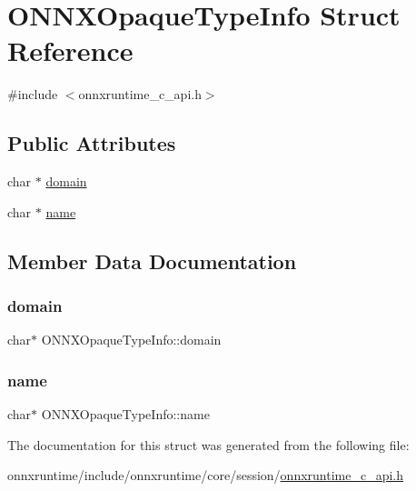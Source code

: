 \hypertarget{structONNXOpaqueTypeInfo}{}\section{O\+N\+N\+X\+Opaque\+Type\+Info Struct Reference}
\label{structONNXOpaqueTypeInfo}


{\ttfamily \#include $<$onnxruntime\+\_\+c\+\_\+api.\+h$>$}

\subsection*{Public Attributes}
\begin{DoxyCompactItemize}
\item 
char $\ast$ \mbox{\hyperlink{structONNXOpaqueTypeInfo_ac63e40eef2da65b51f81c5aff98a0218}{domain}}
\item 
char $\ast$ \mbox{\hyperlink{structONNXOpaqueTypeInfo_adcef8b9c6b57700558f8ad422b087249}{name}}
\end{DoxyCompactItemize}


\subsection{Member Data Documentation}
\mbox{\label{structONNXOpaqueTypeInfo_ac63e40eef2da65b51f81c5aff98a0218}} 
\subsubsection{\texorpdfstring{domain}{domain}}
{\footnotesize\ttfamily char$\ast$ O\+N\+N\+X\+Opaque\+Type\+Info\+::domain}

\mbox{\label{structONNXOpaqueTypeInfo_adcef8b9c6b57700558f8ad422b087249}} 
\subsubsection{\texorpdfstring{name}{name}}
{\footnotesize\ttfamily char$\ast$ O\+N\+N\+X\+Opaque\+Type\+Info\+::name}



The documentation for this struct was generated from the following file\+:\begin{DoxyCompactItemize}
\item 
onnxruntime/include/onnxruntime/core/session/\mbox{\hyperlink{onnxruntime__c__api_8h}{onnxruntime\+\_\+c\+\_\+api.\+h}}\end{DoxyCompactItemize}
